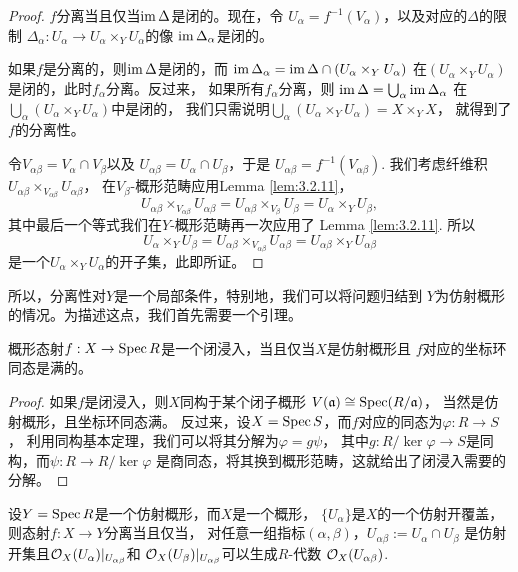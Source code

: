 \begin{proof}
	$f$分离当且仅当$\operatorname{im} \Delta$是闭的。现在，令
	$U_\alpha=f^{-1}(V_\alpha)$，以及对应的$\Delta$的限制
	$\Delta_\alpha:U_\alpha\to U_\alpha\times_Y U_\alpha$的像
	$\operatorname{im} \Delta_\alpha$是闭的。

	如果$f$是分离的，则$\operatorname{im} \Delta$是闭的，而
	$\operatorname{im} \Delta_{\alpha}=\operatorname{im} \Delta \cap (U_\alpha\times_Y U_\alpha)$
	在$(U_\alpha\times_Y U_\alpha)$是闭的，此时$f_\alpha$分离。反过来，
	如果所有$f_\alpha$分离，则
	$
	\operatorname{im} \Delta=\bigcup_\alpha \operatorname{im} \Delta_{\alpha}
	$
	在$\bigcup_\alpha (U_\alpha\times_Y U_\alpha)$中是闭的，
	我们只需说明$\bigcup_\alpha (U_\alpha\times_Y U_\alpha)=X\times_Y X$，
	就得到了$f$的分离性。

	令$V_{\alpha\beta}=V_\alpha\cap V_\beta$以及
	$U_{\alpha\beta}=U_\alpha\cap U_\beta$，于是
	$U_{\alpha\beta}=f^{-1}(V_{\alpha\beta})$. 我们考虑纤维积
	$U_{\alpha\beta}\times_{V_{\alpha\beta}}U_{\alpha\beta}$，
	在$V_\beta$-概形范畴应用Lemma \ref{lem:3.2.11}，
	\[
	U_{\alpha\beta}\times_{V_{\alpha\beta}}U_{\alpha\beta}=
	U_{\alpha\beta}\times_{V_\beta} U_\beta=U_{\alpha}\times_{Y} U_\beta,
	\]
	其中最后一个等式我们在$Y$-概形范畴再一次应用了
	Lemma \ref{lem:3.2.11}. 所以
	\[
	U_\alpha\times_Y U_\beta=U_{\alpha\beta}\times_{V_{\alpha\beta}}
	U_{\alpha\beta}=U_{\alpha\beta}\times_{Y}U_{\alpha\beta}
	\]
	是一个$U_\alpha\times_Y U_\alpha$的开子集，此即所证。
\end{proof}

所以，分离性对$Y$是一个局部条件，特别地，我们可以将问题归结到
$Y$为仿射概形的情况。为描述这点，我们首先需要一个引理。

\begin{lem}
概形态射$f:X\to \operatorname{Spec} R$是一个闭浸入，当且仅当$X$是仿射概形且
$f$对应的坐标环同态是满的。
\end{lem}

\begin{proof}
如果$f$是闭浸入，则$X$同构于某个闭子概形
$V(\mathfrak{a})\cong \operatorname{Spec} (R/\mathfrak a)$，
当然是仿射概形，且坐标环同态满。
反过来，设$X=\operatorname{Spec} S$，而$f$对应的同态为$\varphi:R\to S$，
利用同构基本定理，我们可以将其分解为$\varphi=g\psi$，
其中$g:R/\ker \varphi\to S$是同构，而$\psi:R\to R/\ker\varphi$
是商同态，将其换到概形范畴，这就给出了闭浸入需要的分解。
\end{proof}

\begin{pro}
设$Y=\operatorname{Spec} R$是一个仿射概形，而$X$是一个概形，
$\{U_\alpha\}$是$X$的一个仿射开覆盖，则态射$f:X\to Y$分离当且仅当，
对任意一组指标$(\alpha,\beta)$，$U_{\alpha\beta}:=U_\alpha\cap U_\beta$
是仿射开集且$\mathcal{O}_X(U_{\alpha})|_{U_{\alpha\beta}}$和
$\mathcal{O}_X(U_{\beta})|_{U_{\alpha\beta}}$可以生成$R$-代数
$\mathcal{O}_X(U_{\alpha\beta})$.
\end{pro}

